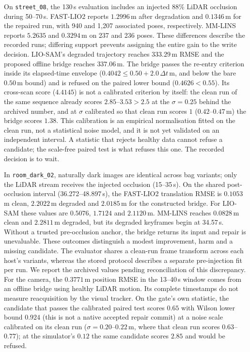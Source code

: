 \documentclass[journal]{IEEEtran}
\begin{document}
On \texttt{street\_08}, the 130\,s evaluation includes an injected 88\% LiDAR occlusion during 50--70\,s. FAST-LIO2 reports $1.2996$\,m after degradation and $0.1346$\,m for the repaired run, with 940 and 1,207 associated poses, respectively. MM-LINS reports $5.2635$ and $0.3294$\,m on 237 and 236 poses. These differences describe the recorded runs; differing support prevents assigning the entire gain to the write decision. LIO-SAM's degraded trajectory reaches $333.29$\,m RMSE and the proposed offline bridge reaches $337.06$\,m. The bridge passes the re-entry criterion inside its elapsed-time envelope ($0.4042\leq0.50+2.0\,\Delta t$\,m, and below the bare $0.50$\,m bound) and is refused on the paired lower bound ($0.4626<0.55$). Its cross-scan score ($4.4145$) is not a calibrated criterion by itself: the clean run of the same sequence already scores $2.85$--$3.53>2.5$ at the $\sigma=0.25$ behind the archived number, and at $\sigma$ calibrated so that clean run scores $1$ ($0.42$--$0.47$\,m) the bridge scores $1.38$. This calibration is an empirical normalisation fitted on the clean run, not a statistical noise model, and it is not yet validated on an independent interval. A statistic that rejects healthy data cannot refuse a candidate; the scale-free paired test is what refuses this one. The recorded decision is to wait.

In \texttt{room\_dark\_02}, naturally dark images are identical across bag variants; only the LiDAR stream receives the injected occlusion (15--35\,s). On the shared post-occlusion interval (36.272--48.897\,s), the FAST-LIO2 translation RMSE is $0.1053$\,m clean, $2.2022$\,m degraded and $2.0185$\,m for the constructed bridge. For LIO-SAM these values are $0.5076$, $1.7124$ and $2.1120$\,m. MM-LINS reaches $0.0828$\,m clean and $2.2811$\,m degraded, but its degraded keyframes begin at 34.57\,s. Without a trusted pre-occlusion anchor, the bridge returns its input and repair is unevaluable. These outcomes distinguish a modest improvement, harm and a missing candidate. The evaluator shares a clean-run frame transform across each host's variants, whereas the stored protocol describes a separate pre-injection fit per run. We report the archived values pending reconciliation of this discrepancy. For the camera, the $0.3771$\,m position RMSE in the 13--40\,s window comes from an offline bridge using healthy LiDAR motion. Its complete timestamps do not measure reacquisition by the visual tracker. On the gate's own statistic, the candidate that passes the calibrated paired test scores $0.65$ with Wilson lower bound $0.924$ (this is not a native accepted repair commit) at a noise scale calibrated on its clean run ($\sigma=0.20$--$0.22$\,m, where that clean run scores $0.63$--$0.77$); at the simulator's $0.12$ the same candidate scores $2.85$ and would be refused.
\end{document}

